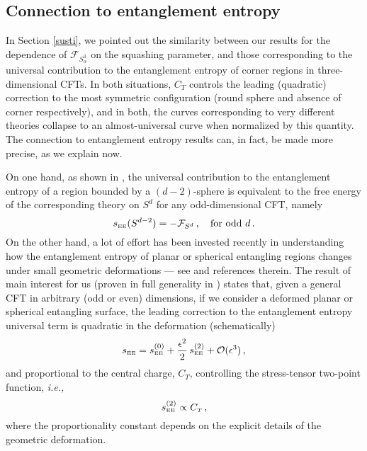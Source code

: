 \documentclass[12pt]{article}
\numberwithin{equation}{section}
\newcommand{\labell}[1]{\label{#1}}
\newcommand{\ssc}{\scriptscriptstyle}
\newcommand{\ie}{{\it i.e.,}\ }
\newcommand{\ctt}{C_{\ssc T}}
\begin{document}
\subsection{Connection to entanglement entropy}
\label{EESD}

In Section \ref{susti}, we pointed out the similarity between our results for the dependence of $\mathcal{F}_{S_{\alpha}^3}$ on the squashing parameter, and those corresponding to the universal contribution to the entanglement entropy of corner regions in three-dimensional CFTs. In both situations, $\ctt$ controls the leading (quadratic) correction to the most symmetric configuration (round sphere and absence of corner respectively), and in both, the curves corresponding to very different theories collapse to an almost-universal curve when normalized by this quantity. The connection to entanglement entropy results can, in fact, be made more precise, as we explain now.

On one hand, as shown in \cite{Casini:2011kv,Dowker:2010yj}, the universal contribution to the entanglement entropy of a region bounded by a $(d-2)$-sphere is equivalent to the free energy of the corresponding theory on $S^d$ for any odd-dimensional CFT, namely
%
\begin{equation}\label{chm}
s_{\rm \ssc EE}(S^{d-2})=-\mathcal{F}_{S^{d}}\, , \quad \text{for odd}\,\, d\, .
\end{equation}
%
On the other hand, a lot of effort has been invested recently in understanding how the entanglement entropy of planar or spherical entangling regions changes under small geometric deformations --- see \cite{Allais:2014ata,Mezei14,Rosenhaus:2014zza,Rosenhaus:2014woa,Lewkowycz:2014jia,Bueno1,Bueno2,Miao2015,Bueno4,faulkner15,Bianchi:2015liz,Bueno5,Carmi:2015dla,Dong:2016wcf,Bianchi:2016xvf,Balakrishnan:2016ttg,Fonda:2015nma} and references therein. The result of main interest for us (proven in full generality in \cite{faulkner15}) states that, given a general CFT in arbitrary (odd or even) dimensions, if we consider a deformed planar or spherical entangling surface, the leading correction to the entanglement entropy universal term  is quadratic in the deformation (schematically)
%
\begin{equation}\labell{s00}
s_{\rm \ssc EE}=s_{\rm \ssc EE}^{(0)}+\frac{\epsilon^2}{2}\,s_{\rm \ssc EE}^{(2)}+\mathcal{O}(\epsilon^3)\, ,
\end{equation}
%
and proportional to the central charge, $\ctt$, controlling the stress-tensor two-point function, \ie
%
\begin{equation}\labell{s20}
s_{\rm \ssc EE}^{(2)}\propto  \ctt\, ,
\end{equation}
%
where the proportionality constant depends on the explicit details of the geometric deformation. 
\end{document}
